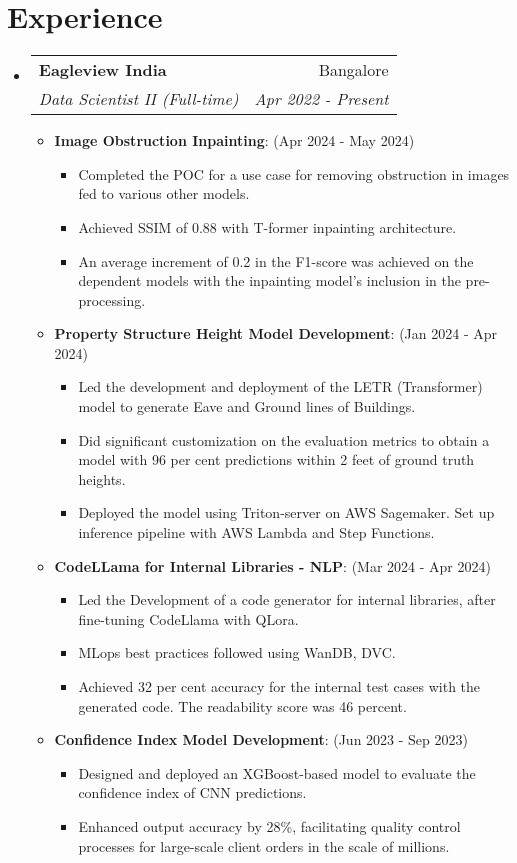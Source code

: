 \documentclass[a4paper,20pt]{article}
\makeatletter
\newcommand{\resumeItem}[2]{
  \item\small{
    \textbf{#1}{: #2 \vspace{-2pt}}
  }
}
\newcommand{\resumeSubheading}[4]{
  \vspace{-1pt}\item
    \begin{tabular*}{0.97\textwidth}{l@{\extracolsep{\fill}}r}
      \textbf{#1} & #2 \\
      \textit{#3} & \textit{#4} \\
    \end{tabular*}\vspace{-5pt}
}
\newcommand{\resumeSubHeadingListStart}{\begin{itemize}[leftmargin=*]}
\newcommand{\resumeSubHeadingListEnd}{\end{itemize}}
\newcommand{\resumeItemListStart}{\begin{itemize}}
\newcommand{\resumeItemListEnd}{\end{itemize}\vspace{-5pt}}
\makeatother
\begin{document}
\section{Experience}
  \resumeSubHeadingListStart
    \resumeSubheading
    {Eagleview India}{Bangalore}
    {Data Scientist II (Full-time)}{Apr 2022 - Present}
    \resumeItemListStart
        \resumeItem{Image Obstruction Inpainting}{(Apr 2024 - May 2024)}
        { 
            \begin{itemize}[leftmargin=*]
                \item Completed the POC for a use case for removing obstruction in images fed to various other models.
                \item Achieved SSIM of 0.88 with T-former inpainting architecture.
                \item An average increment of 0.2 in the F1-score was achieved on the dependent models with the inpainting model's inclusion in the pre-processing.
            \end{itemize}
        }
        \resumeItem{Property Structure Height Model Development}{(Jan 2024 - Apr 2024)}
        { 
            \begin{itemize}[leftmargin=*]
                \item Led the development and deployment of the LETR (Transformer) model to generate Eave and Ground lines of Buildings.
                \item Did significant customization on the evaluation metrics to obtain a model with 96 per cent predictions within 2 feet of ground truth heights.
                \item Deployed the model using Triton-server on AWS Sagemaker. Set up inference pipeline with AWS Lambda and Step Functions.
            \end{itemize}
        }
        \resumeItem{CodeLLama for Internal Libraries - NLP}{(Mar 2024 - Apr 2024)}
        { 
            \begin{itemize}[leftmargin=*]
                \item Led the Development of a code generator for internal libraries, after fine-tuning CodeLlama with QLora.
                \item MLops best practices followed using WanDB, DVC.
                \item Achieved 32 per cent accuracy for the internal test cases with the generated code. The readability score was 46 percent.
            \end{itemize}
        }
        \resumeItem{Confidence Index Model Development}{(Jun 2023 - Sep 2023)}
        {
            \begin{itemize}[leftmargin=*]
                \item Designed and deployed an XGBoost-based model to evaluate the confidence index of CNN predictions.
                \item Enhanced output accuracy by 28\%, facilitating quality control processes for large-scale client orders in the scale of millions.
            \end{itemize}
        }
    \resumeItemListEnd
\resumeSubHeadingListEnd
\end{document}
